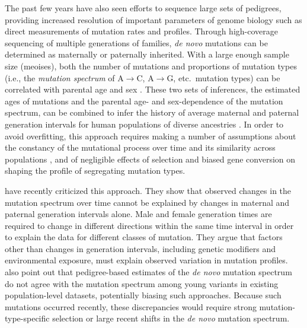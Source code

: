 \documentclass[]{article}
\begin{document}
The past few years have also seen efforts to sequence large sets of pedigrees,
providing increased resolution of important parameters of genome biology such
as direct measurements of mutation rates and profiles. Through high-coverage
sequencing of multiple generations of families, \emph{de novo} mutations can be
determined as maternally or paternally inherited. With a large enough sample
size (meoises), both the number of mutations and proportions of mutation types
(i.e., the \emph{mutation spectrum} of A$\rightarrow$C, A$\rightarrow$G, etc.\
mutation types) can be correlated with parental age and sex
\citep{jonsson2017parental,halldorsson2019characterizing}. These two sets of
inferences, the estimated ages of mutations and the parental age- and
sex-dependence of the mutation spectrum, can be combined to infer the history
of average maternal and paternal generation intervals for human populations of
diverse ancestries \citep{macia2021different,wang2023human}. In order to avoid
overfitting, this approach requires making a number of assumptions about the
constancy of the mutational process over time and its similarity across
populations \citep{harris2015evidence,mathieson2017differences,harris2017rapid,
dewitt2021nonparametric}, and of negligible effects of selection and biased
gene conversion \citep{lachance2014biased,glemin2015quantification} on shaping
the profile of segregating mutation types.

\cite{gao2023limited} have recently criticized this approach.
They show that observed changes in the mutation spectrum over
time cannot be explained by changes in maternal and paternal generation
intervals alone. Male and female generation
times are required to change in different directions within the same time interval in
order to explain the data for different classes of mutation.
They argue that factors other than changes in generation intervals,
including genetic modifiers and environmental exposure, must explain observed
variation in mutation profiles.
\citet{gao2023limited} also point out that pedigree-based estimates of the
\emph{de novo} mutation spectrum do not agree with the mutation spectrum among
young variants in existing population-level datasets,
potentially biasing such approaches. Because such mutations
occurred recently, these discrepancies would require strong mutation-type-specific
selection or large recent shifts in the \emph{de novo} mutation spectrum.
\end{document}
